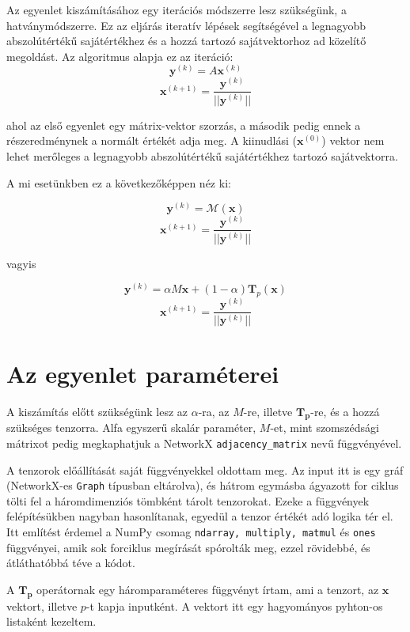 \documentclass[12pt,numbers=noenddot]{report}
\begin{document}
Az egyenlet kiszámításához egy iterációs módszerre lesz szükségünk, a hatványmódszerre.
Ez az eljárás iteratív lépések segítségével a legnagyobb abszolútértékű sajátértékhez
és a hozzá tartozó sajátvektorhoz ad közelítő megoldást. 
Az algoritmus alapja ez az iteráció:
$$\boldsymbol{y}^{(k)} = A \boldsymbol{x}^{(k)}$$
$$\boldsymbol{x}^{(k+1)} = \frac{\boldsymbol{y}^{(k)}}{||\boldsymbol{y}^{(k)}||}$$

ahol az első egyenlet egy mátrix-vektor szorzás, a második pedig ennek a részeredménynek a normált értékét adja meg.
A kiinudlási ($\boldsymbol{x}^{(0)}$) vektor nem lehet merőleges a legnagyobb abszolútértékű sajátértékhez tartozó sajátvektorra.

\pagebreak

A mi esetünkben ez a következőképpen néz ki:

$$\boldsymbol{y}^{(k)} = \mathcal{M}(\boldsymbol{x})$$
$$\boldsymbol{x}^{(k+1)} = \frac{\boldsymbol{y}^{(k)}}{||\boldsymbol{y}^{(k)}||}$$

vagyis

$$\boldsymbol{y}^{(k)} = \alpha M \boldsymbol{x} + (1-\alpha) \boldsymbol{T}_p(\boldsymbol{x})$$
$$\boldsymbol{x}^{(k+1)} = \frac{\boldsymbol{y}^{(k)}}{||\boldsymbol{y}^{(k)}||}$$


\section{Az egyenlet paraméterei}

A kiszámítás előtt szükségünk lesz az $\alpha$-ra, az $M$-re, illetve $\boldsymbol{T_p}$-re, és a hozzá szükséges tenzorra.
Alfa egyszerű skalár paraméter, $M$-et, mint szomszédsági mátrixot pedig megkaphatjuk 
a NetworkX \texttt{adjacency\_matrix} nevű függvényével.

A tenzorok előállítását saját függvényekkel oldottam meg. 
Az input itt is egy gráf (NetworkX-es \texttt{Graph} típusban eltárolva),
és hátrom egymásba ágyazott for ciklus tölti fel a háromdimenziós tömbként tárolt tenzorokat.
Ezeke a függvények felépítésükben nagyban hasonlítanak, egyedül a tenzor értékét adó logika tér el.
Itt említést érdemel a NumPy csomag \texttt{ndarray, multiply, matmul} és \texttt{ones} függvényei,
amik sok forciklus megírását spórolták meg, ezzel rövidebbé, és átláthatóbbá téve a kódot.

A $\boldsymbol{T_p}$ operátornak egy háromparaméteres függvényt írtam, ami a tenzort, 
az $\boldsymbol{x}$ vektort, illetve $p$-t kapja inputként. 
A vektort itt egy hagyományos pyhton-os listaként kezeltem.
\end{document}
